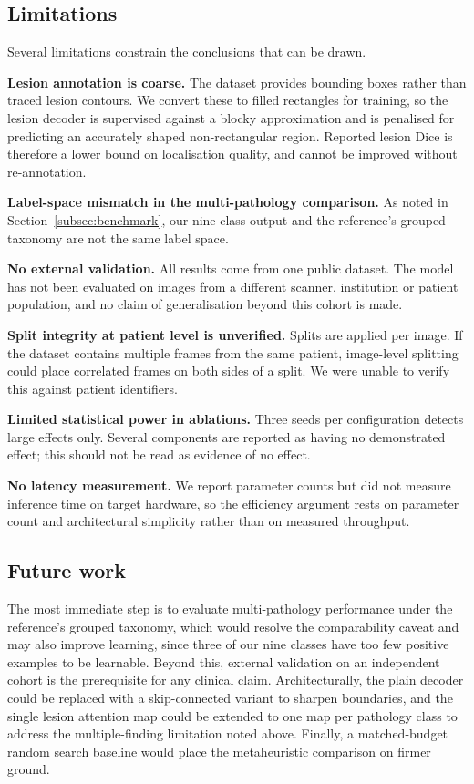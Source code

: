 \documentclass[pdflatex,sn-mathphys-num]{sn-jnl}
\theoremstyle{thmstyleone}%
\theoremstyle{thmstyletwo}%
\theoremstyle{thmstylethree}%
\begin{document}
\subsection{Limitations}\label{subsec:limitations}

Several limitations constrain the conclusions that can be drawn.

\textbf{Lesion annotation is coarse.} The dataset provides bounding boxes rather than traced
lesion contours. We convert these to filled rectangles for training, so the lesion decoder is
supervised against a blocky approximation and is penalised for predicting an accurately shaped
non-rectangular region. Reported lesion Dice is therefore a lower bound on localisation quality,
and cannot be improved without re-annotation.

\textbf{Label-space mismatch in the multi-pathology comparison.} As noted in
Section~\ref{subsec:benchmark}, our nine-class output and the reference's grouped taxonomy are
not the same label space.

\textbf{No external validation.} All results come from one public dataset. The model has not
been evaluated on images from a different scanner, institution or patient population, and no
claim of generalisation beyond this cohort is made.

\textbf{Split integrity at patient level is unverified.} Splits are applied per image. If the
dataset contains multiple frames from the same patient, image-level splitting could place
correlated frames on both sides of a split. We were unable to verify this against patient
identifiers.

\textbf{Limited statistical power in ablations.} Three seeds per configuration detects large
effects only. Several components are reported as having no demonstrated effect; this should not
be read as evidence of no effect.

\textbf{No latency measurement.} We report parameter counts but did not measure inference time
on target hardware, so the efficiency argument rests on parameter count and architectural
simplicity rather than on measured throughput.

\subsection{Future work}\label{subsec:future}

The most immediate step is to evaluate multi-pathology performance under the reference's grouped
taxonomy, which would resolve the comparability caveat and may also improve learning, since
three of our nine classes have too few positive examples to be learnable. Beyond this, external
validation on an independent cohort is the prerequisite for any clinical claim. Architecturally,
the plain decoder could be replaced with a skip-connected variant \cite{bib_unet} to sharpen
boundaries, and the single lesion attention map could be extended to one map per pathology class
to address the multiple-finding limitation noted above. Finally, a matched-budget random search
baseline would place the metaheuristic comparison on firmer ground.
\end{document}
